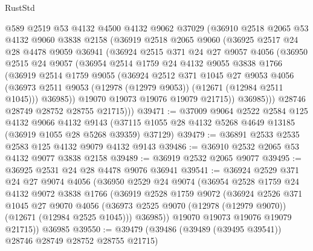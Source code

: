 \begin{lexlean}{RustStd}
\begin{coremodule}
        @589
        @2519
        @53
        @4132
        @4500
        @4132
        @9062
        @37029
        (@36910
          @2518
          @2065
          @53
          @4132
          @9060
          @3838
          @2158
          (@36919
            @2518
            @2065
            @9060
            (@36925
              @2517
              @24
              @28
              @4478
              @9059
              @36941
              (@36924
                @2515
                @371
                @24
                @27
                @9057
                @4056
                (@36950
                  @2515
                  @24
                  @9057
                  (@36954
                    @2514
                    @1759
                    @24
                    @4132
                    @9055
                    @3838
                    @1766
                    (@36919
                      @2514
                      @1759
                      @9055
                      (@36924
                        @2512
                        @371
                        @1045
                        @27
                        @9053
                        @4056
                        (@36973 @2511 @9053 (@12978 (@12979 @9053)) (@12671 (@12984 @2511 @1045)))
                        @36985))
                    @19070
                    @19073
                    @19076
                    @19079
                    @21715))
                @36985)))
          @28746
          @28749
          @28752
          @28755
          @21715)))
@39471 := @37009
    @9064
    @2522
    @2584
    @125
    @4132
    @9066
    @4132
    @9143
    (@37115 @1055 @28 @4132 @5268 @4649 @13185 (@36919 @1055 @28 @5268 @39359) @37129)
@39479 := @36891 @2533 @2535 @2583 @125 @4132 @9079 @4132 @9143
@39486 := @36910 @2532 @2065 @53 @4132 @9077 @3838 @2158
@39489 := @36919 @2532 @2065 @9077
@39495 := @36925 @2531 @24 @28 @4478 @9076 @36941
@39541 := @36924
    @2529
    @371
    @24
    @27
    @9074
    @4056
    (@36950
      @2529
      @24
      @9074
      (@36954
        @2528
        @1759
        @24
        @4132
        @9072
        @3838
        @1766
        (@36919
          @2528
          @1759
          @9072
          (@36924
            @2526
            @371
            @1045
            @27
            @9070
            @4056
            (@36973 @2525 @9070 (@12978 (@12979 @9070)) (@12671 (@12984 @2525 @1045)))
            @36985))
        @19070
        @19073
        @19076
        @19079
        @21715))
    @36985
@39550 := @39479 (@39486 (@39489 (@39495 @39541)) @28746 @28749 @28752 @28755 @21715)

\end{coremodule}
\end{lexlean}
